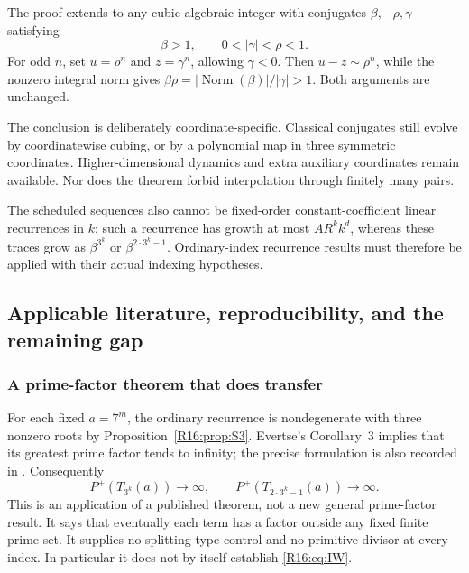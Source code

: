 \documentclass[11pt,a4paper]{article}
\theoremstyle{definition}\newtheorem{definition}[theorem]{Definition}
\theoremstyle{remark}\newtheorem{remark}[theorem]{Remark}
\DeclareMathOperator{\Norm}{Norm}\DeclareMathOperator{\ord}{ord}\DeclareMathOperator{\Gal}{Gal}
\begin{document}
The proof extends to any cubic algebraic integer with conjugates
$\beta,-\rho,\gamma$ satisfying
\[
 \beta>1,\qquad 0<|\gamma|<\rho<1.
\]
For odd $n$, set $u=\rho^n$ and $z=\gamma^n$, allowing $\gamma<0$.
Then $u-z\sim\rho^n$, while the nonzero integral norm gives
$\beta\rho=|\Norm(\beta)|/|\gamma|>1$. Both arguments are unchanged.

The conclusion is deliberately coordinate-specific. Classical conjugates
still evolve by coordinatewise cubing, or by a polynomial map in three
symmetric coordinates. Higher-dimensional dynamics and extra auxiliary
coordinates remain available. Nor does the theorem forbid interpolation
through finitely many pairs.

The scheduled sequences also cannot be fixed-order constant-coefficient
linear recurrences in $k$: such a recurrence has growth at most
$A R^k k^d$, whereas these traces grow as
$\beta^{3^k}$ or $\beta^{2\cdot3^k-1}$. Ordinary-index recurrence
results must therefore be applied with their actual indexing hypotheses.

\subsection{Applicable literature, reproducibility, and the remaining gap}

\subsubsection{A prime-factor theorem that does transfer}

For each fixed $a=7^m$, the ordinary recurrence is nondegenerate with
three nonzero roots by Proposition~\ref{R16:prop:S3}. Evertse's Corollary~3
\cite[p.~230]{R16-Evertse} implies that its greatest prime factor tends to
infinity; the precise formulation is also recorded in
\cite[equation (2), p.~342]{R16-Stewart}. Consequently
\[
 P^+(T_{3^k}(a))\longrightarrow\infty,\qquad
 P^+(T_{2\cdot3^k-1}(a))\longrightarrow\infty.
\]
This is an application of a published theorem, not a new general
prime-factor result. It says that eventually each term has a factor
outside any fixed finite prime set. It supplies no splitting-type control
and no primitive divisor at every index. In particular it does not by
itself establish \eqref{R16:eq:IW}.
\end{document}
